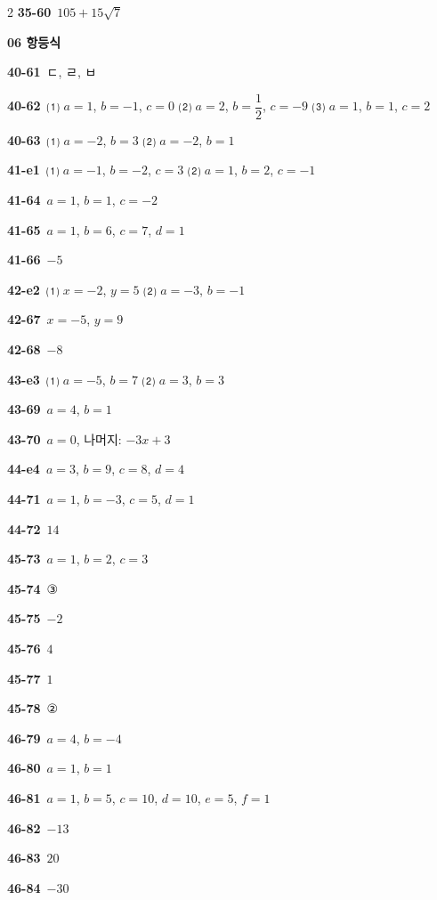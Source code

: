 \documentclass[10pt,a4paper]{article}
\begin{document}
\begin{multicols}{2}
\noindent\textbf{35-60}\ $105+15\sqrt{7}$\par
\noindent\textbf{06 항등식}\par\smallskip
\noindent\textbf{40-61}\ ㄷ, ㄹ, ㅂ\par
\noindent\textbf{40-62}\ ⑴ $a=1$, $b=-1$, $c=0$ \quad ⑵ $a=2$, $b=\dfrac{1}{2}$, $c=-9$ \quad ⑶ $a=1$, $b=1$, $c=2$\par
\noindent\textbf{40-63}\ ⑴ $a=-2$, $b=3$ \quad ⑵ $a=-2$, $b=1$\par
\noindent\textbf{41-e1}\ ⑴ $a=-1$, $b=-2$, $c=3$ \quad ⑵ $a=1$, $b=2$, $c=-1$\par
\noindent\textbf{41-64}\ $a=1$, $b=1$, $c=-2$\par
\noindent\textbf{41-65}\ $a=1$, $b=6$, $c=7$, $d=1$\par
\noindent\textbf{41-66}\ $-5$\par
\noindent\textbf{42-e2}\ ⑴ $x=-2$, $y=5$ \quad ⑵ $a=-3$, $b=-1$\par
\noindent\textbf{42-67}\ $x=-5$, $y=9$\par
\noindent\textbf{42-68}\ $-8$\par
\noindent\textbf{43-e3}\ ⑴ $a=-5$, $b=7$ \quad ⑵ $a=3$, $b=3$\par
\noindent\textbf{43-69}\ $a=4$, $b=1$\par
\noindent\textbf{43-70}\ $a=0$, 나머지: $-3x+3$\par
\noindent\textbf{44-e4}\ $a=3$, $b=9$, $c=8$, $d=4$\par
\noindent\textbf{44-71}\ $a=1$, $b=-3$, $c=5$, $d=1$\par
\noindent\textbf{44-72}\ $14$\par
\noindent\textbf{45-73}\ $a=1$, $b=2$, $c=3$\par
\noindent\textbf{45-74}\ ③\par
\noindent\textbf{45-75}\ $-2$\par
\noindent\textbf{45-76}\ $4$\par
\noindent\textbf{45-77}\ $1$\par
\noindent\textbf{45-78}\ ②\par
\noindent\textbf{46-79}\ $a=4$, $b=-4$\par
\noindent\textbf{46-80}\ $a=1$, $b=1$\par
\noindent\textbf{46-81}\ $a=1$, $b=5$, $c=10$, $d=10$, $e=5$, $f=1$\par
\noindent\textbf{46-82}\ $-13$\par
\noindent\textbf{46-83}\ $20$\par
\noindent\textbf{46-84}\ $-30$\par

\end{multicols}
\end{document}
